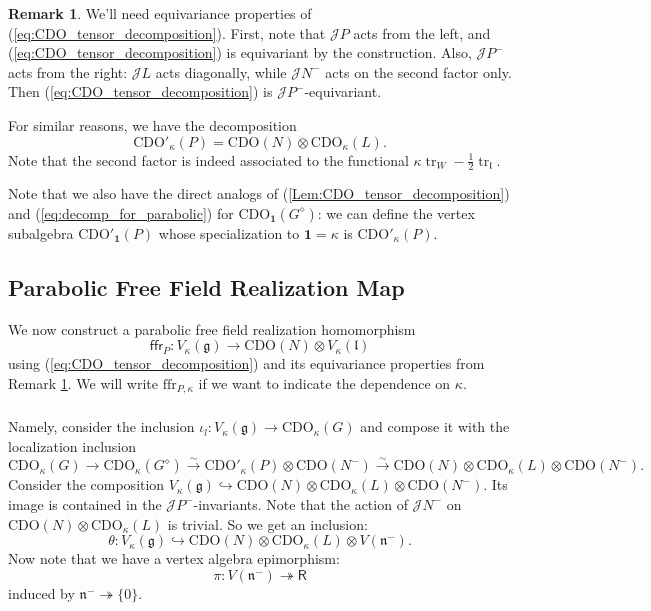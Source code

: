 \documentclass{amsart}
\theoremstyle{definition}
\newtheorem{Rem}[Thm]{Remark}
\newcommand{\sss}{\subsubsection{}}
\newcommand{\Ring}{\mathsf{R}}
\newcommand{\g}{\mathfrak{g}}
\newcommand{\ffr}{\mathrm{ffr}}
\newcommand{\lf}{\mathfrak{l}}
\newcommand{\Jet}{\mathscr{J}}
\newcommand{\CDO}{\mathrm{CDO}}
\newcommand{\bone}{\mathbf{1}}
\numberwithin{equation}{section}
\begin{document}
\begin{Rem}\label{eq:CDO_tensor_decomp_equiv}
We'll need equivariance properties of (\ref{eq:CDO_tensor_decomposition}).  First, note that $\Jet P$ acts from the left, and (\ref{eq:CDO_tensor_decomposition}) is equivariant by the construction. Also, $\Jet P^-$ acts from the right: $\Jet L$ acts diagonally, while $\Jet N^-$ acts on the second factor only. Then (\ref{eq:CDO_tensor_decomposition}) is $\Jet P^-$-equivariant.
\end{Rem}

For similar reasons, we have the decomposition
\begin{equation}\label{eq:decomp_for_parabolic}
\CDO'_\kappa(P)=\CDO(N)\otimes \CDO_\kappa(L).
\end{equation}
Note that the second factor is indeed associated to the functional $\kappa\operatorname{tr}_W-\frac{1}{2}\operatorname{tr}_{\lf}$. 


Note that we also have the direct analogs of (\ref{Lem:CDO_tensor_decomposition}) and (\ref{eq:decomp_for_parabolic})
for $\CDO_{\bone}(G^\diamond)$: we can define the vertex subalgebra 
$\CDO'_{\bone}(P)$ whose specialization to $\mathbf{1}=\kappa$ is 
$\CDO'_\kappa(P)$.


\subsection{Parabolic Free Field Realization Map}\label{SS_CDO_parabolic_free_field}
We now construct a parabolic free field realization homomorphism
\begin{equation}\label{eq:CDO_parabolic_ffr}
\mathsf{ffr}_{P}:V_{\kappa}(\g) \to \CDO(N) \otimes V_{\kappa}(\lf)
\end{equation}
using (\ref{eq:CDO_tensor_decomposition}) and its equivariance properties from Remark \ref{eq:CDO_tensor_decomp_equiv}. We will write $\ffr_{P,\kappa}$ if we want to indicate the dependence on $\kappa$.

\sss\label{SSS:ffr_construction} Namely, consider the  inclusion $\iota_l:V_{\kappa}(\g) \to \CDO_\kappa(G)$ and compose it with the localization inclusion $$\CDO_\kappa(G) \to \CDO_{\kappa}(G^\diamond)\xrightarrow{\sim}\CDO'_\kappa(P)\otimes \CDO(N^-)\xrightarrow{\sim} \CDO(N)\otimes \CDO_{\kappa}(L)\otimes \CDO(N^-).$$ Consider the composition $V_\kappa(\g)\hookrightarrow \CDO(N)\otimes \CDO_\kappa(L)\otimes \CDO(N^-)$.
Its image is contained in the $\Jet P^-$-invariants. 
Note that the action of $\Jet N^-$ on $\CDO(N)\otimes \CDO_\kappa(L)$ is trivial. So we get an inclusion:
\[
\theta: V_{\kappa}(\g) \hookrightarrow \CDO(N) \otimes \CDO_\kappa(L)\otimes V(\mathfrak{n}^-).
\]
Now note that we have a vertex algebra epimorphism:
\[
\pi:V(\mathfrak{n}^-) \twoheadrightarrow \Ring
\]
induced by $\mathfrak{n}^-\twoheadrightarrow \{0\}$. 
\end{document}
